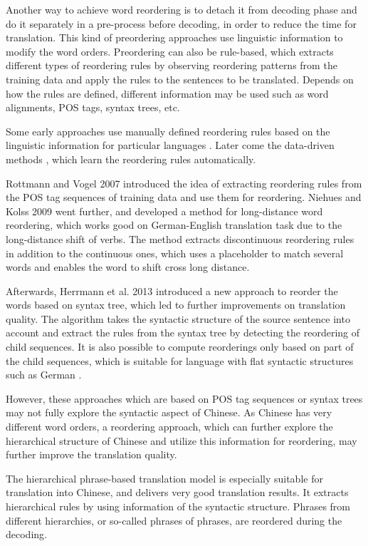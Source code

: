 \documentclass[a4paper]{article}
\begin{document}
Another way to achieve word reordering is to detach it from decoding phase and do it separately in a pre-process before decoding, in order to reduce the time for translation. This kind of preordering approaches use linguistic information to modify the word orders. Preordering can also be rule-based, which extracts different types of reordering rules by observing reordering patterns from the training data and apply the rules to the sentences to be translated. Depends on how the rules are defined, different information may be used such as word alignments, POS tags, syntax trees, etc.

Some early approaches use manually defined reordering rules based on the linguistic information for particular languages \cite{collins2005clause, popovic2006pos,habash2007syntactic,syntactic}. Later come the data-driven methods \cite{zhang2007chunk, crego2008using}, which learn the reordering rules automatically. 

Rottmann and Vogel 2007 \cite{short} introduced the idea of extracting reordering rules from the POS tag sequences of training data and use them for reordering. Niehues and Kolss 2009 \cite{long} went further, and developed a method for long-distance word reordering, which works good on German-English translation task due to the long-distance shift of verbs. The method extracts discontinuous reordering rules in addition to the continuous ones, which uses a placeholder to match several words and enables the word to shift cross long distance.

Afterwards, Herrmann et al. 2013 \cite{tree} introduced a new approach to reorder the words based on syntax tree, which led to further improvements on translation quality. The algorithm takes the syntactic structure of the source sentence into account and extract the rules from the syntax tree by detecting the reordering of child sequences. It is also possible to compute reorderings only based on part of the child sequences, which is suitable for language with flat syntactic structures such as German \cite{combine}.

However, these approaches which are based on POS tag sequences or syntax trees may not fully explore the syntactic aspect of Chinese. As Chinese has very different word orders, a reordering approach, which can further explore the hierarchical structure of Chinese and utilize this information for reordering, may further improve the translation quality.

The hierarchical phrase-based translation model \cite{hier} is especially suitable for translation into Chinese, and delivers very good translation results. It extracts hierarchical rules by using information of the syntactic structure. Phrases from different hierarchies, or so-called phrases of phrases, are reordered during the decoding. 
\end{document}
